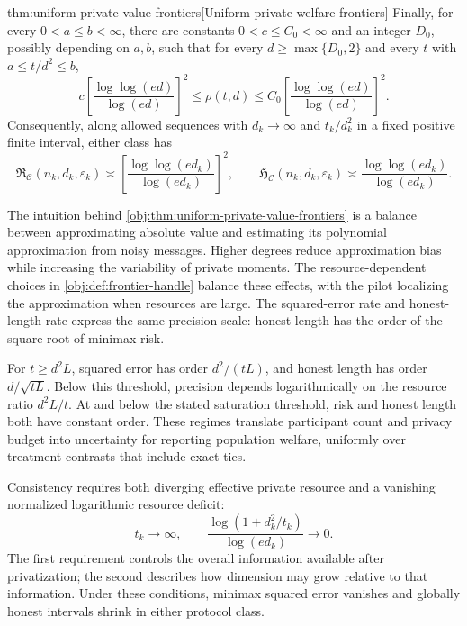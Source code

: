 \documentclass[11pt]{article}
\begin{document}
\begin{theoremv}{thm:uniform-private-value-frontiers}[Uniform private welfare frontiers]
Finally, for every \(0<a\le b<\infty\), there are constants \(0<c\le C_0<\infty\) and an integer \(D_0\), possibly depending on \(a,b\), such that for every \(d\ge\max\{D_0,2\}\) and every \(t\) with \(a\le t/d^2\le b\),
\[
c\left[\frac{\log\log(ed)}{\log(ed)}\right]^2
\le \rho(t,d)\le
C_0\left[\frac{\log\log(ed)}{\log(ed)}\right]^2.
\]
Consequently, along allowed sequences with \(d_k\to\infty\) and \(t_k/d_k^2\) in a fixed positive finite interval, either class has
\[
\mathfrak R_{\mathcal C}(n_k,d_k,\varepsilon_k)
\asymp
\left[\frac{\log\log(ed_k)}{\log(ed_k)}\right]^2,
\qquad
\mathfrak H_{\mathcal C}(n_k,d_k,\varepsilon_k)
\asymp
\frac{\log\log(ed_k)}{\log(ed_k)}.
\]
\end{theoremv}

The intuition behind \cref{obj:thm:uniform-private-value-frontiers} is a balance between approximating absolute value and estimating its polynomial approximation from noisy messages. Higher degrees reduce approximation bias while increasing the variability of private moments. The resource-dependent choices in \cref{obj:def:frontier-handle} balance these effects, with the pilot localizing the approximation when resources are large. The squared-error rate  and honest-length rate  express the same precision scale: honest length has the order of the square root of minimax risk.

For \(t\ge d^2L\), squared error has order \(d^2/(tL)\), and honest length has order \(d/\sqrt{tL}\). Below this threshold, precision depends logarithmically on the resource ratio \(d^2L/t\). At and below the stated saturation threshold, risk and honest length both have constant order. These regimes translate participant count and privacy budget into uncertainty for reporting population welfare, uniformly over treatment contrasts that include exact ties.

Consistency requires both diverging effective private resource and a vanishing normalized logarithmic resource deficit:
\[
t_k\longrightarrow\infty,
\qquad
\frac{\log(1+d_k^2/t_k)}{\log(ed_k)}\longrightarrow0.
\]
The first requirement controls the overall information available after privatization; the second describes how dimension may grow relative to that information. Under these conditions, minimax squared error vanishes and globally honest intervals shrink in either protocol class.
\end{document}
